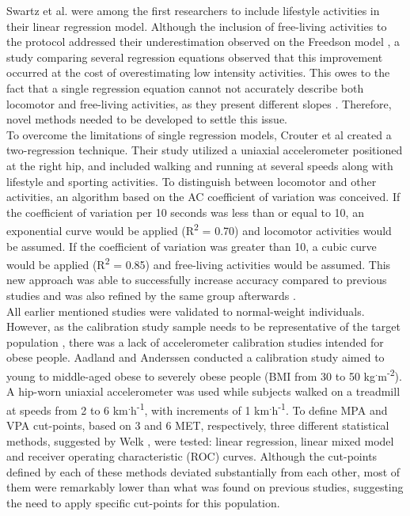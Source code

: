 \documentclass[11pt]{article}
\begin{document}
Swartz et al. \citeyear{Swartz_2000} were among the first researchers to include lifestyle activities in their linear regression model. Although the inclusion of free-living activities to the protocol addressed their underestimation observed on the Freedson model \citeyear{Freedson_1998}, a study comparing several regression equations \cite{Lyden_2012} observed that this improvement occurred at the cost of overestimating low intensity activities. This owes to the fact that a single regression equation cannot not accurately describe both locomotor and free-living activities, as they present different slopes \cite{Crouter_2006}. Therefore, novel methods needed to be developed to settle this issue. \\

To overcome the limitations of single regression models, Crouter et al \citeyear{Crouter_2006} created a two-regression technique. Their study utilized a uniaxial accelerometer positioned at the right hip, and included walking and running at several speeds along with lifestyle and sporting activities. To distinguish between locomotor and other activities, an algorithm based on the AC coefficient of variation was conceived. If the coefficient of variation per 10 seconds was less than or equal to 10, an exponential curve would be applied (R\textsuperscript{2} = 0.70) and locomotor activities would be assumed. If the coefficient of variation was greater than 10, a cubic curve would be applied (R\textsuperscript{2} = 0.85) and free-living activities would be assumed. This new approach was able to successfully increase accuracy compared to previous studies and was also refined by the same group afterwards \cite{Crouter_2010}. \\

All earlier mentioned studies were validated to normal-weight individuals. However, as the calibration study sample needs to be representative of the target population \cite{Welk_2005, Strath_2012}, there was a lack of accelerometer calibration studies intended for obese people. Aadland and Anderssen \citeyear{Aadland_2012} conducted a calibration study aimed to young to middle-aged obese to severely obese people (BMI from 30 to 50 kg\textsuperscript{.}m\textsuperscript{-2}). A hip-worn uniaxial accelerometer was used while subjects walked on a treadmill at speeds from 2 to 6 km\textsuperscript{.}h\textsuperscript{-1}, with increments of 1 km\textsuperscript{.}h\textsuperscript{-1}.  To define MPA and VPA cut-points, based on 3 and 6 MET, respectively, three different statistical methods, suggested by Welk \citeyear{Welk_2005}, were tested: linear regression, linear mixed model and receiver operating characteristic (ROC) curves. Although the cut-points defined by each of these methods deviated substantially from each other, most of them were remarkably lower than what was found on previous studies, suggesting the need to apply specific cut-points for this population.

\pagebreak



\end{document}
